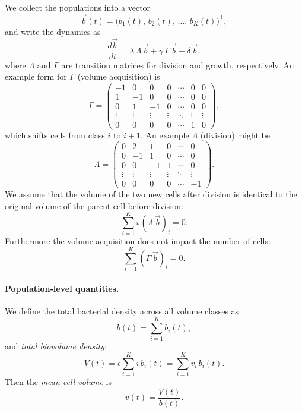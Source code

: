 \noindent
We collect the populations into a vector
\begin{equation*}
  \vec{b}(t)
  =
  \bigl(b_1(t),\,b_2(t),\,\dots,\,b_K(t)\bigr)^\mathsf{T},
\end{equation*}
and write the dynamics as
\begin{equation}
  \label{eq:filamentation-ode}
  \frac{d\vec{b}}{dt}
  =
  \lambda\,\Lambda\,\vec{b}
  +
  \gamma\,\Gamma\,\vec{b}
  -
  \delta\,\vec{b},
\end{equation}
where \(\Lambda\) and \(\Gamma\) are transition matrices for division and growth, respectively.
An example form for \(\Gamma\) (volume acquisition) is
\begin{equation*}
  \Gamma
  =
  \begin{pmatrix}
    -1 & 0 & 0 & 0 & \cdots & 0 & 0\\
    1 & -1 & 0 & 0 & \cdots & 0 & 0\\
    0 & 1 & -1 & 0 & \cdots & 0 & 0\\
    \vdots & \vdots & \vdots & \vdots & \ddots & \vdots & \vdots\\
    0 & 0 & 0 & 0 & \cdots & 1 & 0
  \end{pmatrix},
\end{equation*}
which shifts cells from class \(i\) to \(i+1\).
An example \(\Lambda\) (division) might be
\begin{equation*}
  \Lambda
  =
  \begin{pmatrix}
    0 & 2 & 1 & 0 & \cdots & 0 \\
    0 & -1 & 1 & 0 & \cdots & 0 \\
    0 & 0 & -1 & 1 & \cdots & 0 \\
    \vdots & \vdots & \vdots & \vdots & \ddots & \vdots \\
    0 & 0 & 0 & 0 & \cdots & -1
  \end{pmatrix}.
\end{equation*}
We assume that the volume of the two new cells after division is identical to the original volume of the parent cell before division:
\begin{equation}
  \sum_{i=1}^{K} i\,(\Lambda\, \vec{b})_i = 0.
\end{equation}
Furthermore the volume acquisition does not impact the number of cells:
\begin{equation}
  \sum_{i=1}^{K} (\Gamma\, \vec{b})_i = 0.
\end{equation}

\paragraph{Population‐level quantities.}
We define the total bacterial density across all volume classes as
\begin{equation}
  b(t)=\sum_{i=1}^{K} b_i(t),
\end{equation}
and \emph{total biovolume density}:
\begin{equation}
  V(t)=\epsilon\sum_{i=1}^{K} i\,b_i(t)=\sum_{i=1}^{K} v_i\,b_i(t).
\end{equation}
Then the \emph{mean cell volume} is
\begin{equation}
  v(t)=\frac{V(t)}{b(t)}.
\end{equation}

